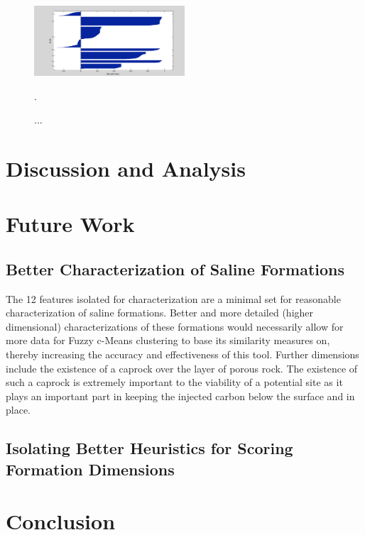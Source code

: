 \documentclass[a4paper, 12pt]{article}
\begin{document}
\begin{figure}%
   \centering
  \includegraphics[width=0.5\textwidth]{k_means_sil}
   \caption{\label{k_means_sil} ... }. 
\end{figure}


\section{Discussion and Analysis}

\section{Future Work}
\subsection{Better Characterization of Saline Formations}
The 12 features isolated for characterization are a minimal set for reasonable characterization of saline formations. Better and more detailed (higher dimensional) characterizations of these formations would necessarily allow for more data for Fuzzy c-Means clustering to base its similarity measures on, thereby increasing the accuracy and effectiveness of this tool. Further dimensions include the existence of a caprock over the layer of porous rock. The existence of such a caprock is extremely important to the viability of a potential site as it plays an important part in keeping the injected carbon below the surface and in place.  

\subsection{Isolating Better Heuristics for Scoring Formation Dimensions}
\section{Conclusion}
\end{document}
